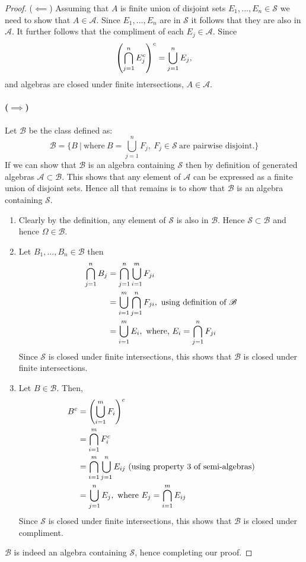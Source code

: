 \begin{proof}
  ($\impliedby$) Assuming that $A$ is finite union of disjoint sets $E_1,...,E_n\in \mathscr{S}$ we need to show that $A\in\mathscr{A}$. Since $E_1,...,E_n$ are in $\mathscr{S}$ it follows that they are also in $\mathscr{A}$. It further follows that the compliment of each $E_j\in \mathscr{A}$. Since
  \[\left(\bigcap_{j=1}^n E_j^c \right)^c = \bigcup_{j=1}^n E_j,\]
  and algebras are closed under finite intersections, $A\in \mathscr{A}$.
  \paragraph{($\implies$)} Let $\mathscr{B}$ be the class defined as:
  \[ \mathscr{B} = \{B\ |\ \text{where}\ B=\bigcup_{j=1}^n F_j,\ F_j \in \mathscr{S}\ \text{are pairwise disjoint.} \}\]
  If we can show that $ \mathscr{B}$ is an algebra containing $ \mathscr{S}$ then by definition of generated algebras $ \mathscr{A}\subset \mathscr{B}$. This shows that any element of $ \mathscr{A}$ can be expressed as a finite union of disjoint sets. Hence all that remains is to show that $ \mathscr{B}$ is an algebra containing $ \mathscr{S}$.
  \begin{enumerate}
    \item Clearly by the definition, any element of $ \mathscr{S}$ is also in $ \mathscr{B}$. Hence $ \mathscr{S} \subset \mathscr{B}$ and hence $\Omega \in \mathscr{B}$.
    \item Let $B_1,...,B_n\in \mathscr{B}$ then
      \begin{align*}
        \bigcap_{j=1}^n B_j &= \bigcap_{j=1}^n \bigcup_{i=1}^m F_{ji}\\
                 &= \bigcup_{i=1}^m \bigcap_{j=1}^n F_{ji},\ \text{using definition of $ \mathscr{B}$}\\
                 &= \bigcup_{i=1}^m E_i,\ \text{where,}\ E_i = \bigcap_{j=1}^n F_{ji}
      \end{align*}
      Since $ \mathscr{S}$ is closed under finite intersections, this shows that $ \mathscr{B}$ is closed under finite intersections.
    \item Let $B\in \mathscr{B}$. Then,
      \begin{align*}
        B^c &= \left( \bigcup_{i=1}^m F_i \right)^c\\
           &= \bigcap_{i=1}^m F_i^c\\
           &= \bigcap_{i=1}^m \bigcup_{j=1}^n E_{ij}\ \text{(using property 3 of semi-algebras)}\\
           &= \bigcup_{j=1}^n E_j,\ \text{where}\ E_j= \bigcap_{i=1}^m E_{ij}
      \end{align*}
      Since $ \mathscr{S}$ is closed under finite intersections, this shows that $ \mathscr{B}$ is closed under compliment. 
  \end{enumerate}
  $ \mathscr{B}$ is indeed an algebra containing $ \mathscr{S}$, hence completing our proof.
\end{proof}
